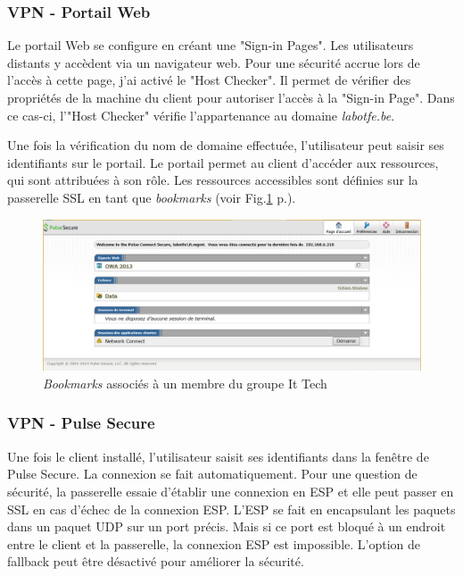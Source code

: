 \subsubsection{VPN - Portail Web}
Le portail Web se configure en créant une "Sign-in Pages".
Les utilisateurs distants y accèdent via un navigateur web.
Pour une sécurité accrue lors de l'accès à cette page, j'ai activé le "Host Checker".
Il permet de vérifier des propriétés de la machine du client pour autoriser l'accès à la "Sign-in Page".
Dans ce cas-ci, l'"Host Checker" vérifie l'appartenance au domaine \textit{labotfe.be}. 

Une fois la vérification du nom de domaine effectuée, l'utilisateur peut saisir ses identifiants sur le portail.
Le portail permet au client d'accéder aux ressources, qui sont attribuées à son rôle.
Les ressources accessibles sont définies sur la passerelle SSL en tant que \textit{bookmarks} (voir Fig.\ref{fig:bookmarks} p.\pageref{fig:bookmarks}).
\begin{figure}[ht]
	\centering
	\includegraphics[width=16cm]{juniper/portail.png}
	\caption{\textit{Bookmarks} associés à un membre du groupe It Tech}
	\label{fig:bookmarks}
\end{figure}

\subsubsection{VPN - Pulse Secure}
Une fois le client installé, l'utilisateur saisit ses identifiants dans la fenêtre de Pulse Secure. 
La connexion se fait automatiquement. 
Pour une question de sécurité, la passerelle essaie d'établir une connexion en ESP et elle peut passer en SSL en cas d'échec de la connexion ESP.
L'ESP se fait en encapsulant les paquets dans un paquet UDP sur un port précis.
Mais si ce port est bloqué à un endroit entre le client et la passerelle, la connexion ESP est impossible.
L'option de fallback peut être désactivé pour améliorer la sécurité. 

